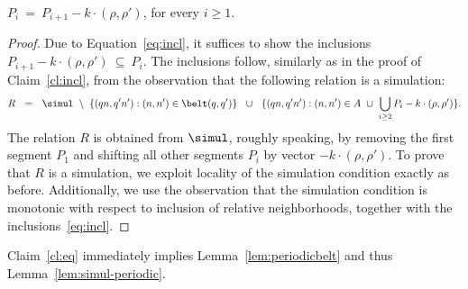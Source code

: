 \begin{claim} \label{cl:eq}
$P_i \ = \ P_{i+1} - k \cdot (\rho, \rho')$, for every $i \geq 1$.
\end{claim}
\begin{proof}
Due to Equation~\eqref{eq:incl}, it suffices to show the inclusions $P_{i+1} - k \cdot (\rho, \rho') \ \subseteq \ P_i$.
The inclusions follow, similarly as in the proof of Claim~\ref{cl:incl}, from the observation that the following relation
is a simulation:
\[
R \ \ =  \ \ \simul \ \setminus\  \{ (q n, q' n') : (n, n') \in \belt(q,q') \} 
\ \ \cup \ \ \{ (q n, q' n') : (n,n') \in A 
\ \cup \ \bigcup_{i \geq 2} P_i - k \cdot (\rho,\rho') \}.
\]
The relation $R$ is obtained from $\simul$, roughly speaking, by removing the first segment $P_1$ and shifting all other segments
$P_i$ by vector $- k \cdot (\rho, \rho')$. To prove that $R$ is a simulation, we exploit locality of the simulation condition 
exactly as before.
Additionally, we use the observation that the simulation condition is monotonic with respect to inclusion of relative neighborhoods,
together with the inclusions~\eqref{eq:incl}.
\end{proof}

\noindent
Claim~\ref{cl:eq} immediately implies Lemma~\ref{lem:periodicbelt}
and thus Lemma~\ref{lem:simul-periodic}.

























